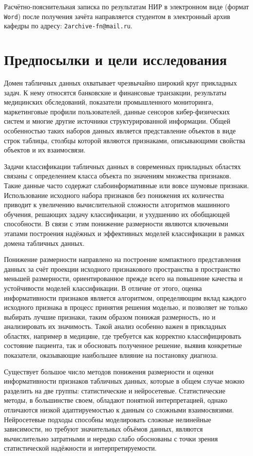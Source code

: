 \documentclass[12pt,a4paper]{article}
\begin{document}
Расчётно-пояснительная записка по результатам НИР в электронном виде (формат \texttt{Word})
после получения зачёта направляется студентом в электронный архив кафедры
по адресу: \texttt{2archive-fn@mail.ru}.

\section{Предпосылки и цели исследования}

Домен табличных данных охватывает чрезвычайно широкий круг 
прикладных задач. К нему относятся банковские и финансовые 
транзакции, результаты медицинских обследований, показатели 
промышленного мониторинга, маркетинговые профили пользователей, 
данные сенсоров кибер-физических систем и многие другие источники 
структурированной информации. Общей особенностью таких наборов 
данных является представление объектов в виде строк таблицы, 
столбцы которой являются признаками, описывающими свойства объектов 
и их взаимосвязи.

Задачи классификации табличных данных в современных прикладных областях связаны с определением класса объекта по значениям множества 
признаков. Такие данные часто содержат слабоинформативные или вовсе шумовые признаки. 
Использование исходного набора признаков без понижения их количества приводит к 
увеличению вычислительной сложности алгоритмов машинного обучения, решающих задачу классификации, и 
ухудшению их обобщающей способности. В связи с этим понижение размерности являются ключевыми 
этапами построения надёжных и эффективных моделей классификации в рамках домена табличных данных.

Понижение размерности направлено на построение компактного представления данных за счёт 
проекции исходного признакового пространства в пространство меньшей размерности, 
ориентированное прежде всего на повышение качества и устойчивости моделей классификации. 
В отличие от этого, оценка информативности признаков является алгоритмом, определяющим вклад 
каждого исходного признака в процесс принятия решения моделью, и позволяет не только выбирать 
лучшие признаки, таким образом понижая размерность, но и анализировать их значимость. 
Такой анализ особенно важен в прикладных областях, например в медицине, где требуется как 
корректно классифицировать состояние пациента, так и обосновать полученное решение, 
выявив конкретные показатели, оказывающие наибольшее влияние на постановку диагноза.

Существует большое число методов понижения размерности и оценки информативности признаков 
табличных данных, которые в общем случае можно разделить на две группы: статистические и 
нейросетевые. Статистические методы, в большинстве своем, обладают понятной интерпретацией, однако отличаются 
низкой адаптируемостью к данным со сложными взаимосвязями. Нейросетевые подходы способны 
моделировать сложные нелинейные зависимости, но требуют значительных объёмов данных, 
являются вычислительно затратными и нередко слабо обоснованы с точки зрения статистической 
надёжности и интерпретируемости.
\end{document}
